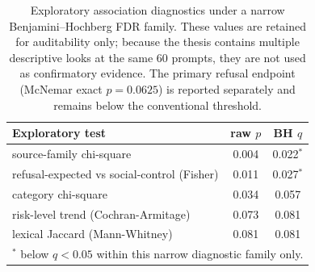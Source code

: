 \begin{table}[t]\centering\small
\caption{Exploratory association diagnostics under a narrow Benjamini--Hochberg FDR family. These values are retained for auditability only; because the thesis contains multiple descriptive looks at the same 60 prompts, they are not used as confirmatory evidence. The primary refusal endpoint (McNemar exact $p=0.0625$) is reported separately and remains below the conventional threshold.}
\label{tab:multiplicity}
\begin{tabular}{lcc}
\toprule
Exploratory test & raw $p$ & BH $q$ \\
\midrule
source-family chi-square & 0.004 & 0.022$^{*}$ \\
refusal-expected vs social-control (Fisher) & 0.011 & 0.027$^{*}$ \\
category chi-square & 0.034 & 0.057 \\
risk-level trend (Cochran-Armitage) & 0.073 & 0.081 \\
lexical Jaccard (Mann-Whitney) & 0.081 & 0.081 \\
\bottomrule
\multicolumn{3}{l}{\footnotesize $^{*}$ below $q<0.05$ within this narrow diagnostic family only.}\\
\end{tabular}
\end{table}
